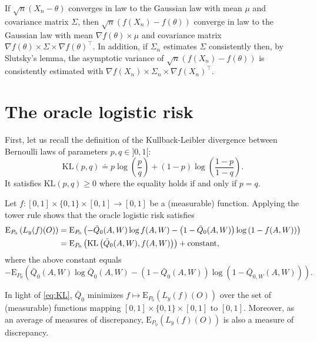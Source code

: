\documentclass[11pt,openright,twoside]{book}
\newcommand{\defq}{\doteq}
\newcommand{\Exp}{\textrm{E}}
\newcommand{\Qbar}{\bar{Q}}
\theoremstyle{definition}
\theoremstyle{definition}
\theoremstyle{definition}
\theoremstyle{remark}
\let\BeginKnitrBlock\begin \let\EndKnitrBlock\end
\begin{document}
\BeginKnitrBlock{proposition}
\protect\hypertarget{prp:unnamed-chunk-6}{}{\label{prp:unnamed-chunk-6} }If \(\sqrt{n} (X_{n} - \theta)\) converges in law to the Gaussian law with mean
\(\mu\) and covariance matrix \(\Sigma\), then \(\sqrt{n} (f(X_{n}) - f(\theta))\)
converge in law to the Gaussian law with mean \(\nabla f(\theta) \times \mu\)
and covariance matrix \(\nabla f(\theta) \times \Sigma \times \nabla f(\theta)^{\top}\). In addition, if \(\Sigma_{n}\) estimates \(\Sigma\)
consistently then, by Slutsky's lemma, the asymptotic variance of \(\sqrt{n} (f(X_{n}) - f(\theta))\) is consistently estimated with \(\nabla f(X_{n}) \times \Sigma_{n} \times \nabla f(X_{n})^{\top}\).
\EndKnitrBlock{proposition}

\hypertarget{oracle-logistic-risk}{%
\section{The oracle logistic risk}\label{oracle-logistic-risk}}

First, let us recall the definition of the Kullback-Leibler divergence between
Bernoulli laws of parameters \(p,q\in]0,1[\):
\begin{equation*}\text{KL}(p,q)  \defq  p \log\left(\frac{p}{q}\right)  +
(1-p) \log \left(\frac{1-p}{1-q}\right).\end{equation*}
It satisfies \(\text{KL}(p,q) \geq 0\) where the equality holds if and only if
\(p=q\).

Let \(f:[0,1] \times \{0,1\} \times [0,1] \to [0,1]\) be a (measurable)
function. Applying the tower rule shows that the oracle logistic risk
satisfies
\begin{align} 
\Exp_{P_{0}}  \left(L_{y}   (f)(O)\right)&=\Exp_{P_{0}}  \left(-\Qbar_{0}(A,W)
\log   f(A,W)   -   \left(1   -  \Qbar_{0}   (A,W)\right)   \log   \left(1   -
f(A,W)\right)\right)\notag\\&=\Exp_{P_{0}}
\left(\text{KL}\left(\Qbar_{0}(A,W),           f(A,W)\right)\right)          +
\text{constant},\label{eq:KL} 
\end{align}
where the above constant equals \begin{equation*} -\Exp_{P_{0}}\left(\Qbar_{0}(A,W) \log \Qbar_{0}(A,W) - \left(1 - \Qbar_{0} (A,W)\right) \log \left(1 - \Qbar_{0,W}(A,W)\right)\right).  \end{equation*}

In light of \eqref{eq:KL}, \(\Qbar_{0}\) minimizes \(f \mapsto \Exp_{P_{0}} \left(L_{y} (f)(O)\right)\) over the set of (measurable) functions mapping
\([0,1] \times \{0,1\} \times [0,1]\) to \([0,1]\). Moreover, as an average of
measures of discrepancy, \(\Exp_{P_{0}} \left(L_{y} (f)(O)\right)\) is also a
measure of discrepancy.
\end{document}
